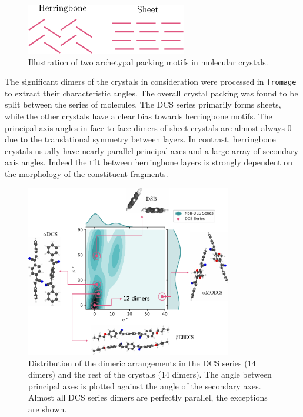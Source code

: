 
\begin{figure}
\includegraphics[width=7cm]{Chapters/7Applications/packings.pdf}
\caption{Illustration of two archetypal packing motifs in molecular crystals.}
\label{fig:packing}
\end{figure}

The significant dimers of the crystals in consideration were processed in \texttt{fromage} to extract their characteristic angles. The overall crystal packing was found to be split between the series of molecules. The DCS series primarily forms sheets, while the other crystals have a clear bias towards herringbone motifs. The principal axis angles in face-to-face dimers of sheet crystals are almost always 0\degree{} due to the translational symmetry between layers. In contrast, herringbone crystals usually have nearly parallel principal axes and a large array of secondary axis angles. Indeed the tilt between herringbone layers is strongly dependent on the morphology of the constituent fragments.

\begin{figure}
\centering
\includegraphics[width=9cm]{Chapters/7Applications/angles.pdf}
\caption{Distribution of the dimeric arrangements in the DCS series (14 dimers) and the rest of the crystals (14 dimers). The angle between principal axes is plotted against the angle of the secondary axes. Almost all DCS series dimers are perfectly parallel, the exceptions are shown.}
\label{fig:angles}
\end{figure}



